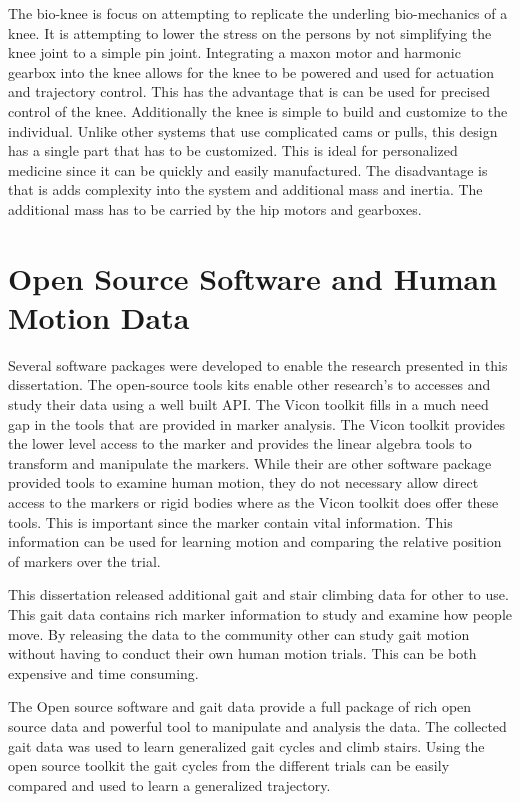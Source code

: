 The bio-knee is focus on attempting to replicate the underling bio-mechanics of a knee. It is attempting to lower the stress on the persons by not simplifying the knee joint to a simple pin joint. Integrating a maxon motor and harmonic gearbox into the knee allows for the knee to be powered and used for actuation and trajectory control. This has the advantage that is can be used for precised control of the knee. Additionally the knee is simple to build and customize to the individual. Unlike other systems that use complicated cams or pulls, this design has a single part that has to be customized. This is ideal for personalized medicine since it can be quickly and easily manufactured. The disadvantage is that is adds complexity into the system and additional mass and inertia. The additional mass has to be carried by the hip motors and gearboxes.



\section{Open Source Software and Human Motion Data}

Several software packages were developed to enable the research presented in this dissertation. The open-source tools kits enable other research's to accesses and study their data using a well built API. The Vicon toolkit fills in a much need gap in the tools that are provided in marker analysis. The Vicon toolkit provides the lower level access to the marker and provides the linear algebra tools to transform and manipulate the markers. While their are other software package provided tools to examine human motion, they do not necessary allow direct access to the markers or rigid bodies where as the Vicon toolkit does offer these tools. This is important since the marker contain vital information. This information can be used for learning motion and comparing the relative position of markers over the trial. 

This dissertation released additional gait and stair climbing data for other to use. This gait data contains rich marker information to study and examine how people move. By releasing the data to the community other can study gait motion without having to conduct their own human motion trials. This can be both expensive and time consuming. 

The Open source software and gait data provide a full package of rich open source data and powerful tool to manipulate and analysis the data. The collected gait data was used to learn generalized gait cycles and climb stairs. Using the open source toolkit the gait cycles from the different trials can be easily compared and used to learn a generalized trajectory. 



